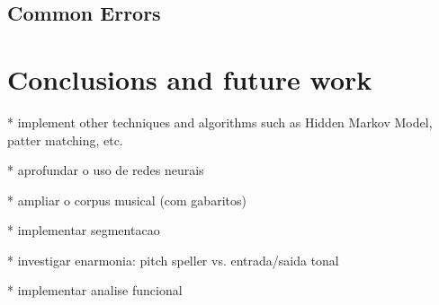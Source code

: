 \documentclass{article}
\begin{document}
\subsection{Common Errors}



\section{Conclusions and future work}
\label{sec:concl-future-work}


* implement other techniques and algorithms such as Hidden Markov
Model, patter matching, etc.

* aprofundar o uso de redes neurais

* ampliar o corpus musical (com gabaritos)

* implementar segmentacao

* investigar enarmonia: pitch speller vs. entrada/saida tonal

* implementar analise funcional



\end{document}
